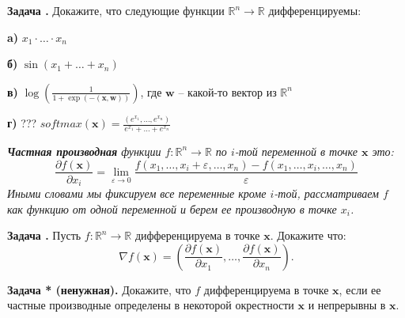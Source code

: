 \documentclass[12pt,a4paper]{article}
\def\R{\mathbb{R}}
\newcounter{znum}
\newcommand{\z}[1]{\addtocounter{znum}{1} \textbf{Задача \arabic{znum}#1. }}
\begin{document}
\z{} Докажите, что следующие функции $\R^n \to \R$ дифференцируемы: \par
\textbf{a)} $x_1 \cdot \ldots \cdot x_n$ \par
\textbf{б)} $\sin(x_1 + \ldots + x_n)$ \par
\textbf{в)} $\log\left(\frac{1}{1 + \exp(-(\mathbf{x}, \mathbf{w}))}\right)$, где $\mathbf{w}$ -- какой-то вектор из $\R^n$ \par
\textbf{г)} ??? $softmax(\mathbf{x}) = \frac{(e^{x_1}, \ldots, e^{x_n})}{e^{x_1} + \ldots + e^{x_n}}$\par


{\it \textbf{Частная производная} функции $f : \R^n \to \R$ по $i$-той переменной в точке $\mathbf{x}$ это:
$$ \frac{\partial f(\mathbf{x})}{\partial x_i} = \lim_{\varepsilon \to 0} \frac{f(x_1, \ldots, x_i + \varepsilon,\ldots, x_n) - f(x_1, \ldots, x_i,\ldots, x_n)}{\varepsilon} $$
Иными словами мы фиксируем все переменные кроме $i$-той, рассматриваем $f$ как функцию от одной переменной и берем ее производную в точке $x_i$.
}

\z{} Пусть $f : \R^n \to \R$ дифференцируема в точке $\mathbf{x}$. Докажите что:
$$ \nabla f(\mathbf{x}) = \left(\frac{\partial f(\mathbf{x})}{\partial x_1}, \ldots, \frac{\partial f(\mathbf{x})}{\partial x_n}\right) .$$

\z{* (ненужная)} Докажите, что $f$ дифференцируема в точке $\mathbf{x}$, если ее частные производные определены в некоторой окрестности $\mathbf{x}$ и непрерывны в $\mathbf{x}$.
\end{document}
